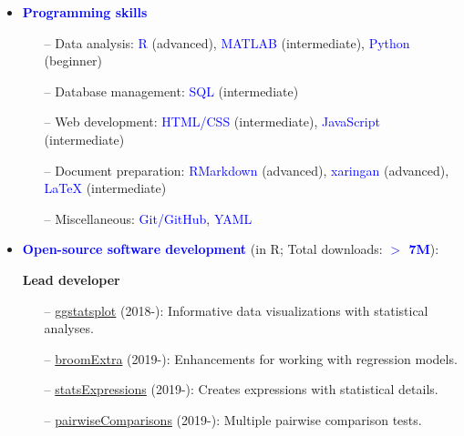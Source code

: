 \documentclass[10pt]{article}
\begin{document}
	\begin{itemize}
	
	\item \textcolor{blue}{\textbf{Programming skills}}\\
     \vspace*{-0.09in}
     
    \begin{itemize}
    
    \itemsep-0.1em		
	\item[--] Data analysis: \textcolor{blue}{R} (advanced), \textcolor{blue}{MATLAB} (intermediate), \textcolor{blue}{Python} (beginner)
	\item[--] Database management: \textcolor{blue}{SQL} (intermediate)
	\item[--] Web development: \textcolor{blue}{HTML/CSS} (intermediate), \textcolor{blue}{JavaScript} (intermediate)
	\item[--] Document preparation: \textcolor{blue}{RMarkdown} (advanced), \textcolor{blue}{xaringan} (advanced), \textcolor{blue}{\LaTeX{}} (intermediate)
	\item[--] Miscellaneous: \textcolor{blue}{Git/GitHub}, \textcolor{blue}{YAML} 

	\end{itemize}
	
	\item \textcolor{blue}{\textbf{Open-source software development}} (in R; Total downloads: \textcolor{blue}{\textbf{$>$ 7M}}):
	 
	 \textbf{Lead developer}
	 
	\begin{itemize}
	
	 \vspace*{-0.09in}
	\itemsep-0.1em
	\item[--] \href{https://indrajeetpatil.github.io/ggstatsplot/}{ggstatsplot} (2018-): Informative data visualizations with statistical analyses.
	\item[--] \href{https://indrajeetpatil.github.io/broomExtra/}{broomExtra} (2019-): Enhancements for working with regression models.
	\item[--] \href{https://indrajeetpatil.github.io/statsExpressions/}{statsExpressions} (2019-): Creates expressions with statistical details.
	\item[--] \href{https://indrajeetpatil.github.io/pairwiseComparisons/}{pairwiseComparisons} (2019-): Multiple pairwise comparison tests.
	
	\end{itemize}
	

\end{itemize}
\end{document}

